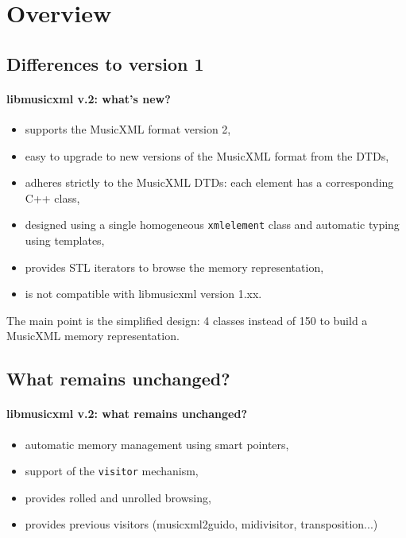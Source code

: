 \documentclass{beamer}
\begin{document}
\chapter{Overview}
\section{Differences to version 1}
\begin{frame}
	\frametitle{libmusicxml v.2: what's new?}
	\begin{itemize}
		\item supports the MusicXML format version 2,
		\item easy to upgrade to new versions of the MusicXML format from the DTDs,
		\item adheres strictly to the MusicXML DTDs: each element has a corresponding C++ class,
		\item designed using a single homogeneous \texttt{xmlelement} class and automatic
		typing using templates,
		\item provides STL iterators to browse the memory representation,
		\item is \alert{not compatible} with libmusicxml version 1.xx.
	\end{itemize}
	\begin{block}{}
	The main point is the simplified design: 4 classes instead of 150 to build a MusicXML
	memory representation.
	\end{block}
\end{frame}

\section{What remains unchanged?}
\begin{frame}
	\frametitle{libmusicxml v.2: what remains unchanged?}
	\begin{itemize}
		\item automatic memory management using smart pointers,
		\item support of the \texttt{visitor} mechanism,
		\item provides rolled and unrolled browsing,
		\item provides previous visitors (musicxml2guido, midivisitor, transposition...)
	\end{itemize}
\end{frame}
\end{document}
